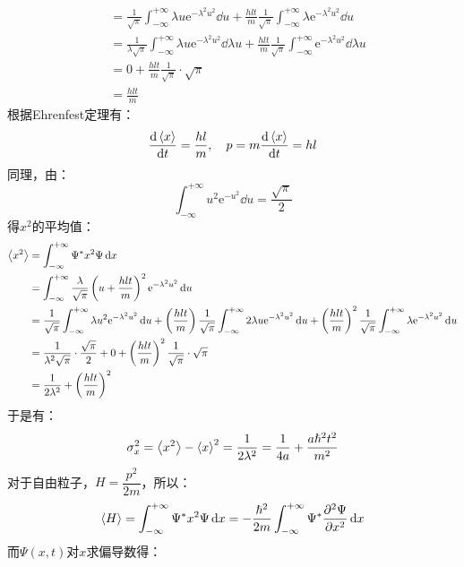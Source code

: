 \documentclass[a4paper,fontset=none]{ctexart}
\renewcommand\hbar\hslash
\begin{document}
\begin{itemize}
\begin{align*}
            &= \frac{1}{\sqrt{\pi}} \int_{-\infty}^{+\infty} \lambda u \mathrm{e}^{-\lambda^2 u^2} \dd{u}
            + \frac{hlt}{m} \frac{1}{\sqrt{\pi}} \int_{-\infty}^{+\infty} \lambda \mathrm{e}^{-\lambda^2 u^2} \dd{u} \\
            &= \frac{1}{\lambda\sqrt{\pi}} \int_{-\infty}^{+\infty} \lambda u \mathrm{e}^{-\lambda^2 u^2} \dd{\lambda u}
            + \frac{hlt}{m} \frac{1}{\sqrt{\pi}} \int_{-\infty}^{+\infty} \mathrm{e}^{-\lambda^2 u^2} \dd{\lambda u} \\
            &= 0 + \frac{hlt}{m} \frac{1}{\sqrt{\pi}} \cdot \sqrt{\pi} \\
            &= \frac{hlt}{m}
        \end{align*}
        根据Ehrenfest定理有：
        \[
            \dv{\expval{x}}{t} = \frac{hl}{m},\quad
            p = m\dv{\expval{x}}{t} = hl
        \]
        同理，由：
        \[
            \int_{-\infty}^{+\infty} u^2 \mathrm{e}^{-u^2} \dd{u} = \frac{\sqrt{\pi}}{2}
        \]
        得$x^2$的平均值：
        \begin{align*}
            \expval{x^2}
            &= \int_{-\infty}^{+\infty} \Psi^* x^2 \Psi \dd{x} \\
            &= \int_{-\infty}^{+\infty} \frac{\lambda}{\sqrt{\pi}} \left(u + \frac{hlt}{m}\right)^2 \mathrm{e}^{-\lambda^2 u^2} \dd{u} \\
            &= \frac{1}{\sqrt{\pi}} \int_{-\infty}^{+\infty} \lambda u^2 \mathrm{e}^{-\lambda^2 u^2} \dd{u}
            + \left(\frac{hlt}{m}\right) \frac{1}{\sqrt{\pi}} \int_{-\infty}^{+\infty} 2\lambda u \mathrm{e}^{-\lambda^2 u^2} \dd{u}
            + \left(\frac{hlt}{m}\right)^2 \frac{1}{\sqrt{\pi}} \int_{-\infty}^{+\infty} \lambda \mathrm{e}^{-\lambda^2 u^2} \dd{u} \\
            &= \frac{1}{\lambda^2 \sqrt{\pi}} \cdot \frac{\sqrt{\pi}}{2} + 0 + \left(\frac{hlt}{m}\right)^2 \frac{1}{\sqrt{\pi}} \cdot \sqrt{\pi} \\
            &= \frac{1}{2\lambda^2} + \left(\frac{hlt}{m}\right)^2
        \end{align*}
        于是有：
        \[
            \sigma_x^2 = \expval{x^2} - \expval{x}^2 = \frac{1}{2\lambda^2} = \frac{1}{4a} + \frac{a\hbar^2 t^2}{m^2}
        \]
        对于自由粒子，$H = \dfrac{p^2}{2m}$，所以：
        \[
            \expval{H}
            = \int_{-\infty}^{+\infty} \Psi^* x^2 \Psi \dd{x}
            = -\frac{\hbar^2}{2m} \int_{-\infty}^{+\infty} \Psi^* \pdv[2]{\Psi}{x} \dd{x}
        \]
        而$\Psi(x,t)$对$x$求偏导数得：

\end{itemize}
\end{document}
